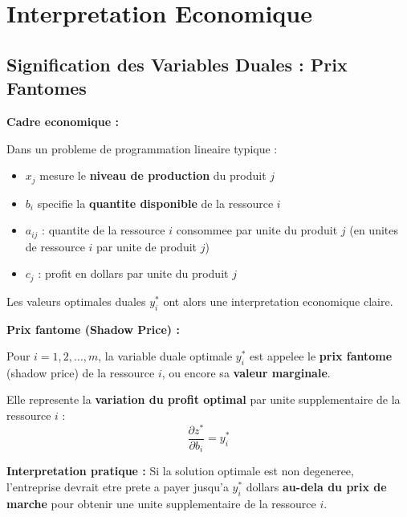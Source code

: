 \documentclass[12pt,a4paper]{article}
\begin{document}
\newpage
\section{Interpretation Economique}

\subsection{Signification des Variables Duales : Prix Fantomes}

\begin{notecours}
\textbf{Cadre economique :}

Dans un probleme de programmation lineaire typique :
\begin{itemize}
    \item $x_j$ mesure le \textcolor{titrebleu}{\textbf{niveau de production}} du produit $j$
    \item $b_i$ specifie la \textcolor{defvert}{\textbf{quantite disponible}} de la ressource $i$
    \item $a_{ij}$ : quantite de la ressource $i$ consommee par unite du produit $j$ (en unites de ressource $i$ par unite de produit $j$)
    \item $c_j$ : profit en dollars par unite du produit $j$
\end{itemize}

Les valeurs optimales duales $y_i^*$ ont alors une interpretation economique claire.
\end{notecours}

\begin{definition}
\textbf{Prix fantome (Shadow Price) :}

Pour $i = 1, 2, \ldots, m$, la variable duale optimale $y_i^*$ est appelee le \textcolor{importantrouge}{\textbf{prix fantome}} (shadow price) de la ressource $i$, ou encore sa \textcolor{defvert}{\textbf{valeur marginale}}.

Elle represente la \textcolor{algoviolet}{\textbf{variation du profit optimal}} par unite supplementaire de la ressource $i$ :
$$\frac{\partial z^*}{\partial b_i} = y_i^*$$

\textbf{Interpretation pratique :} Si la solution optimale est non degeneree, l'entreprise devrait etre prete a payer jusqu'a $y_i^*$ dollars \textbf{au-dela du prix de marche} pour obtenir une unite supplementaire de la ressource $i$.
\end{definition}
\end{document}
